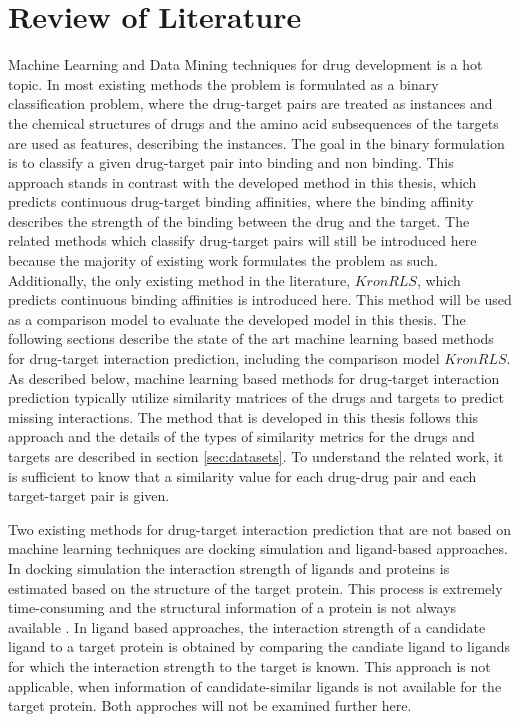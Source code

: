 \chapter{Review of Literature}
\label{chp:review}
Machine Learning and Data Mining techniques for drug development is a hot topic. In most existing methods the problem is formulated as a binary classification problem, where the drug-target pairs are treated as instances and the chemical structures of drugs and the amino acid subsequences of the targets are used as features, describing the instances. The goal in the binary formulation is to classify a given drug-target pair into binding and non binding. This approach stands in contrast with the developed method in this thesis, which predicts continuous drug-target binding affinities, where the binding affinity describes the strength of the binding between the drug and the target. The related methods which classify drug-target pairs will still be introduced here because the majority of existing work formulates the problem as such. Additionally, the only existing method in the literature, $KronRLS$, which predicts continuous binding affinities is introduced here. This method will be used as a comparison model to evaluate the developed model in this thesis. The following sections describe the state of the art machine learning based methods for drug-target interaction prediction, including the comparison model $KronRLS$. As described below, machine learning based methods for drug-target interaction prediction typically utilize similarity matrices of the drugs and targets to predict missing interactions. The method that is developed in this thesis follows this approach and the details of the types of similarity metrics for the drugs and targets are described in section \ref{sec:datasets}. To understand the related work, it is sufficient to know that a similarity value for each drug-drug pair and each target-target pair is given.

Two existing methods for drug-target interaction prediction that are not based on machine learning techniques are docking simulation and ligand-based approaches. In docking simulation the interaction strength of ligands and proteins is estimated based on the structure of the target protein. This process is extremely time-consuming and the structural information of a protein is not always available \cite{liu2016neighborhood}. In ligand based approaches, the interaction strength of a candidate ligand to a target protein is obtained by comparing the candiate ligand to ligands for which the interaction strength to the target is known. This approach is not applicable, when information of candidate-similar ligands is not available for the target protein. Both approches will not be examined further here. 

